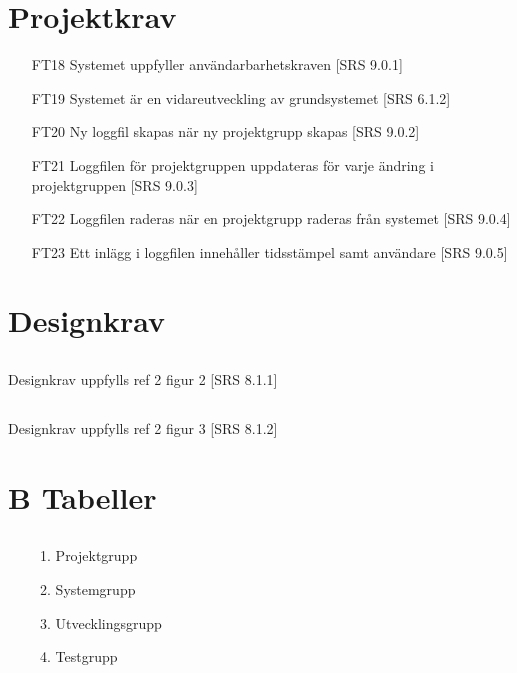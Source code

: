 \documentclass[paper=a4, fontsize=11pt,twoside]{article}
\begin{document}
\section{Projektkrav} 
\begin{itemize}
\item[FT18] Systemet uppfyller användarbarhetskraven [SRS 9.0.1] 
\item[FT19] Systemet är en vidareutveckling av grundsystemet [SRS 6.1.2]
\item[FT20] Ny loggfil skapas när ny projektgrupp skapas [SRS 9.0.2]
\item[FT21] Loggfilen för projektgruppen uppdateras för varje ändring i
projektgruppen [SRS 9.0.3]
\item[FT22] Loggfilen raderas när en projektgrupp raderas från systemet [SRS
9.0.4] 
\item[FT23] Ett inlägg i loggfilen innehåller tidsstämpel samt användare [SRS
9.0.5]
\end{itemize}

\section{Designkrav} 

\subsection{}
Designkrav uppfylls ref 2 figur 2 [SRS 8.1.1]
\subsection{}
Designkrav uppfylls ref 2 figur 3 [SRS 8.1.2]
\section*{B Tabeller}

\subsection{ }
\begin{enumerate}
\item[]
	\begin{enumerate}
	\item Projektgrupp
	\item Systemgrupp
	\item Utvecklingsgrupp
	\item Testgrupp
	\end{enumerate}
\end{enumerate}
\end{document}
